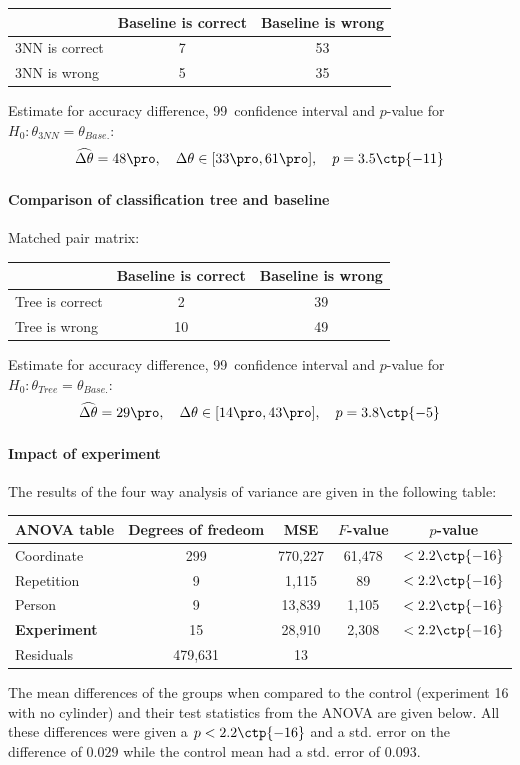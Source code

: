 \documentclass[11pt,fleqn]{article}
\begin{document}
\begin{table}[H]
	\centering
	\begin{tabular}{l|c c}
		&Baseline is correct& Baseline is wrong \\
		\hline
		3NN is correct &7& 53\\
		3NN is wrong& 5& 35
	\end{tabular}
\end{table}\noindent 
Estimate for accuracy difference, 99\pro\ confidence interval and \(p\)-value for \(H_0: \theta_{3NN}=\theta_{Base.}\):
\[
\widehat{\Delta \theta} = 48\pro,\quad  \Delta \theta\in[33\pro , 61\pro], \quad p = 3.5\ctp{-11}
\]

\paragraph{Comparison of classification tree and baseline}
Matched pair matrix:

\begin{table}[H]
	\centering
	\begin{tabular}{l|c c}
		&Baseline is correct& Baseline is wrong \\
		\hline
		Tree is correct &2& 39\\
		Tree is wrong& 10& 49
	\end{tabular}
\end{table}\noindent 
Estimate for accuracy difference, 99\pro\ confidence interval and \(p\)-value for \(H_0: \theta_{Tree}=\theta_{Base.}\):
\[
\widehat{\Delta \theta} = 29\pro,\quad  \Delta \theta\in[14\pro , 43\pro], \quad p = 3.8\ctp{-5}
\]

\paragraph{Impact of experiment} The results of the four way analysis of variance are given in the following table:

\begin{table}[H]
	\centering
	\begin{tabular}{l | c c c c}
		ANOVA table & Degrees of fredeom& MSE&\(F\)-value&\(p\)-value\\
		\hline 
		Coordinate  & 299 & 770,227 & 		61,478 	& \(<2.2\ctp{-16}\)	\\
		Repetition  & 9 &  1,115 & 			89	 	&\(<2.2\ctp{-16}\)  \\
		Person  & 9 & 13,839 &	 			1,105 	&\(<2.2\ctp{-16}\)	\\
		\textbf{Experiment}  & 15 &  28,910 & 2,308 & \(<2.2\ctp{-16}\)	\\
		Residuals &479,631 & 13 &			
	\end{tabular}
		\label{tab:ranova}
\end{table}\noindent
The mean differences of the groups when compared to the control (experiment 16 with no cylinder) and their test statistics from the ANOVA are given below. All these differences were given a \(p<2.2\ctp{-16}\) and a std. error on the difference of \(0.029\) while the control mean had a std. error of \(0.093\).
\end{document}

